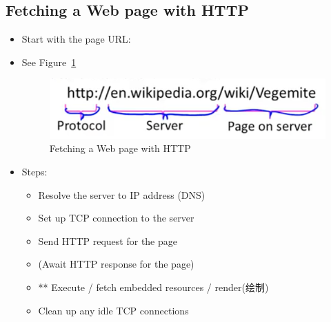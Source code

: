 \documentclass[12pt]{ctexart}   %
\begin{document}
	\subsection{Fetching a Web page with HTTP}
	\begin{itemize}
		\item Start with the page URL:
		\item See Figure~\ref{fig:8-4-4}
		  
		 \begin{figure}[h!] %
		\centering
		 \includegraphics[scale=0.7]{images/8-4-4}
		\caption{ Fetching a Web page with HTTP }
		 \label{fig:8-4-4}
		 \end{figure}
		 
		 \item Steps:
		 \begin{itemize}
		 	\item Resolve the server to IP address (DNS)
		 	\item Set up TCP connection to the server
		 	\item Send HTTP request for the page
		 	\item (Await HTTP response for the page)
		 	\item {\color{pink} **} Execute / fetch embedded resources / render(绘制)
		 	\item Clean up any idle TCP connections
		 \end{itemize}
	\end{itemize}
	
\end{document}
